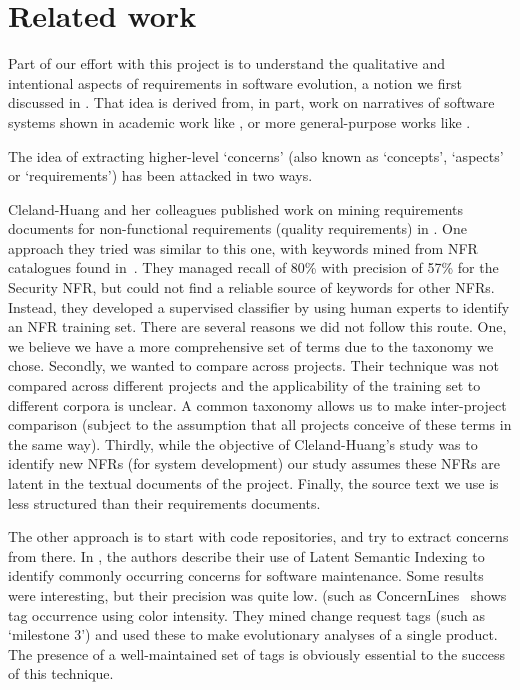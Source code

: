 \documentclass[10pt, conference, compsocconf]{IEEEtran}
\begin{document}
\section{Related work}
Part of our effort with this project is to understand the qualitative and intentional aspects of requirements in software evolution, a notion we first discussed in \cite{ernst07icsm}. That idea is derived from, in part, work on narratives of software systems shown in academic work like \cite{anton01}, or more general-purpose works like \cite{waldo93}.

The idea of extracting higher-level `concerns' (also known as `concepts', `aspects' or `requirements') has been attacked in two ways.

Cleland-Huang and her colleagues published work on mining requirements documents for non-functional requirements (quality requirements) in \cite{Cleland-Huang2006}. One approach they tried was similar to this one, with keywords mined from NFR catalogues found in~\cite{chung99}. They managed recall of 80\% with precision of 57\% for the Security NFR, but could not find a reliable source of keywords for other NFRs. Instead, they developed a supervised classifier by using human experts to identify an NFR training set. There are several reasons we did not follow this route. One, we believe we have a more comprehensive set of terms due to the taxonomy we chose. Secondly, we wanted to compare across projects. Their technique was not compared across different projects and the applicability of the training set to different corpora is unclear. A common taxonomy allows us to make inter-project comparison (subject to the assumption that all projects conceive of these terms in the same way). Thirdly, while the objective of Cleland-Huang's study was to identify new NFRs (for system development) our study assumes these NFRs are latent in the textual documents of the project. 
Finally, the source text we use is less structured than their requirements documents.

The other approach is to start with code repositories, and try to extract concerns from there. In \cite{marcus04wcre}, the authors describe their use of Latent Semantic Indexing to identify commonly occurring concerns for software maintenance. Some results were interesting, but their precision was quite low.  (such as 
ConcernLines~\cite{treude09cl} shows tag occurrence using color intensity. They mined change request tags (such as `milestone 3') and used these to make evolutionary analyses of a single product. The presence of a well-maintained set of tags is obviously essential to the success of this technique.
\end{document}
